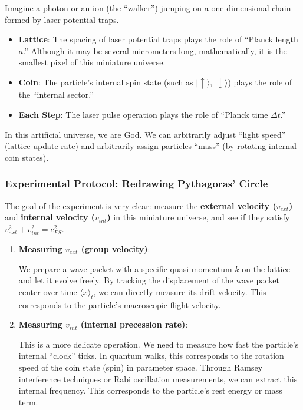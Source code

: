 Imagine a photon or an ion (the ``walker'') jumping on a one-dimensional chain formed by laser potential traps.

\begin{itemize}
\item \textbf{Lattice}: The spacing of laser potential traps plays the role of ``Planck length $a$.'' Although it may be several micrometers long, mathematically, it is the smallest pixel of this miniature universe.

\item \textbf{Coin}: The particle's internal spin state (such as $|\uparrow\rangle, |\downarrow\rangle$) plays the role of the ``internal sector.''

\item \textbf{Each Step}: The laser pulse operation plays the role of ``Planck time $\Delta t$.''
\end{itemize}

In this artificial universe, we are God. We can arbitrarily adjust ``light speed'' (lattice update rate) and arbitrarily assign particles ``mass'' (by rotating internal coin states).

\subsubsection{Experimental Protocol: Redrawing Pythagoras' Circle}

The goal of the experiment is very clear: measure the \textbf{external velocity ($v_{ext}$)} and \textbf{internal velocity ($v_{int}$)} in this miniature universe, and see if they satisfy $v_{ext}^2 + v_{int}^2 = c_{FS}^2$.

\begin{enumerate}
\item \textbf{Measuring $v_{ext}$ (group velocity)}:

    We prepare a wave packet with a specific quasi-momentum $k$ on the lattice and let it evolve freely. By tracking the displacement of the wave packet center over time $\langle x \rangle_t$, we can directly measure its drift velocity. This corresponds to the particle's macroscopic flight velocity.

\item \textbf{Measuring $v_{int}$ (internal precession rate)}:

    This is a more delicate operation. We need to measure how fast the particle's internal ``clock'' ticks. In quantum walks, this corresponds to the rotation speed of the coin state (spin) in parameter space. Through Ramsey interference techniques or Rabi oscillation measurements, we can extract this internal frequency. This corresponds to the particle's rest energy or mass term.
\end{enumerate}

